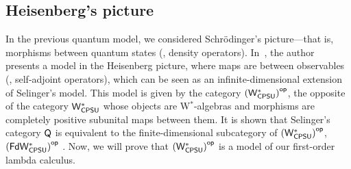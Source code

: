 \subsection{Heisenberg's picture} \label{subsec:w*_cats}

In the previous quantum model, we considered Schr\"odinger's picture---that is, morphisms between quantum states (\ie, density operators). In~\cite{choSemanticsQuantumProgramming2016}, the author presents a model in the Heisenberg picture, where maps are between observables (\ie, self-adjoint operators), which can be seen as an infinite-dimensional extension of Selinger’s model. This model is given by the category $\left(\mathsf{W^*_{CPSU}}\right)^{\mathsf{op}}$, the opposite of the category $\mathsf{W^*_{CPSU}}$ whose objects are W$^*$-algebras and morphisms are completely positive subunital maps between them. It is shown that Selinger’s category $\mathsf{Q}$ is equivalent to the finite-dimensional subcategory of $\left(\mathsf{W^*_{CPSU}}\right)^{\mathsf{op}}$, $\left(\mathsf{FdW^*_{CPSU}}\right)^{\mathsf{op}}$ \cite{choSemanticsQuantumProgramming2016}. Now, we will prove that $\left(\mathsf{W^*_{CPSU}}\right)^{\mathsf{op}}$ is a model of our first-order lambda calculus.







